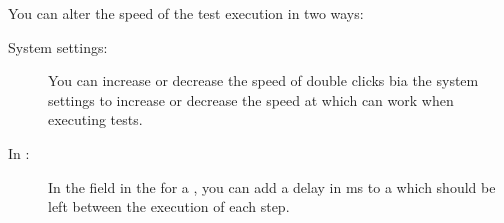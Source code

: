
You can alter the speed of the test execution in two ways:

\begin{description}
\item [System settings:]{You can increase or decrease the speed of double clicks bia the system settings to increase or decrease the speed at which \app{} can work when executing tests. }
\item [In \gdsuites{}:]{In the  field in the \gdpropview{} for a \gdsuite{}, you can add a delay in ms to a \gdsuite{} which should be left between the execution of each step. }
\end{description}

